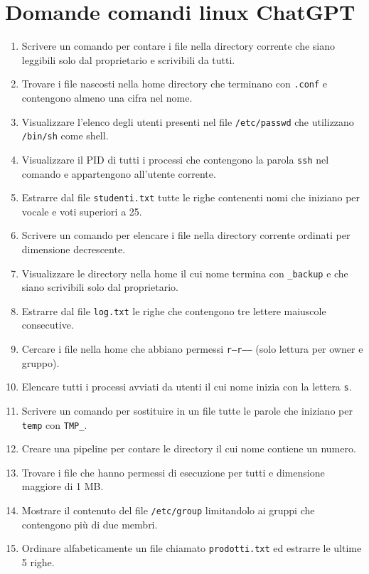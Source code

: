 \documentclass{report}
\begin{document}
\section{Domande comandi linux ChatGPT}
\begin{enumerate}
    \item Scrivere un comando per contare i file nella directory corrente che siano leggibili solo dal proprietario e scrivibili da tutti.
    \item Trovare i file nascosti nella home directory che terminano con \texttt{.conf} e contengono almeno una cifra nel nome.
    \item Visualizzare l’elenco degli utenti presenti nel file \texttt{/etc/passwd} che utilizzano \texttt{/bin/sh} come shell.
    \item Visualizzare il PID di tutti i processi che contengono la parola \texttt{ssh} nel comando e appartengono all’utente corrente.
    \item Estrarre dal file \texttt{studenti.txt} tutte le righe contenenti nomi che iniziano per vocale e voti superiori a 25.
    \item Scrivere un comando per elencare i file nella directory corrente ordinati per dimensione decrescente.
    \item Visualizzare le directory nella home il cui nome termina con \texttt{\_backup} e che siano scrivibili solo dal proprietario.
    \item Estrarre dal file \texttt{log.txt} le righe che contengono tre lettere maiuscole consecutive.
    \item Cercare i file nella home che abbiano permessi \texttt{r--r-----} (solo lettura per owner e gruppo).
    \item Elencare tutti i processi avviati da utenti il cui nome inizia con la lettera \texttt{s}.
    \item Scrivere un comando per sostituire in un file tutte le parole che iniziano per \texttt{temp} con \texttt{TMP\_}.
    \item Creare una pipeline per contare le directory il cui nome contiene un numero.
    \item Trovare i file che hanno permessi di esecuzione per tutti e dimensione maggiore di 1 MB.
    \item Mostrare il contenuto del file \texttt{/etc/group} limitandolo ai gruppi che contengono più di due membri.
    \item Ordinare alfabeticamente un file chiamato \texttt{prodotti.txt} ed estrarre le ultime 5 righe.

\end{enumerate}
\end{document}
